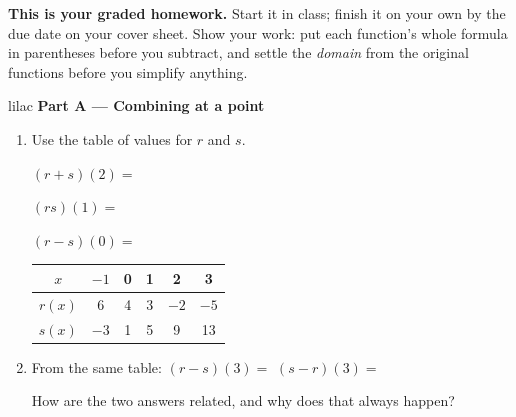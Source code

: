 \documentclass[10pt]{article}
\begin{document}

\vspace{0.1in}

\boxguard[8]
\begin{remindbox}
\small
\textbf{This is your graded homework.} Start it in class; finish it on your own by the due date
on your cover sheet. Show your work: put each function's whole formula in parentheses before you
subtract, and settle the \emph{domain} from the original functions before you simplify anything.
\end{remindbox}

\vspace{0.1in}

\begin{headlinebox}{lilac}
\textbf{\color{plum}Part A --- Combining at a point}
\end{headlinebox}

\begin{enumerate}[leftmargin=1.9em, itemsep=8pt]

\item \begin{minipage}[t]{0.48\linewidth}
      \vspace{0pt}
      Use the table of values for $r$ and $s$.

      \smallskip
      $(r+s)(2) = $ \blank{1.8cm}

      \smallskip
      $(rs)(1) = $ \blank{1.8cm}

      \smallskip
      $(r-s)(0) = $ \blank{1.8cm}
      \end{minipage}\hfill
      \begin{minipage}[t]{0.46\linewidth}
      \vspace{0pt}
      \centering
      {\renewcommand{\arraystretch}{1.3}
      \begin{tabular}{|c|c|c|c|c|c|}
      \hline
      $x$    & $-1$ & 0 & 1 & 2 & 3 \\ \hline
      $r(x)$ & 6    & 4 & 3 & $-2$ & $-5$ \\ \hline
      $s(x)$ & $-3$ & 1 & 5 & 9 & 13 \\ \hline
      \end{tabular}}
      \end{minipage}

\item From the same table: \quad $(r-s)(3) = $ \blank{1.8cm} \qquad $(s-r)(3) = $ \blank{1.8cm}

      How are the two answers related, and why does that always happen?
      \writespace{0.9cm}{}

\end{enumerate}
\end{document}
